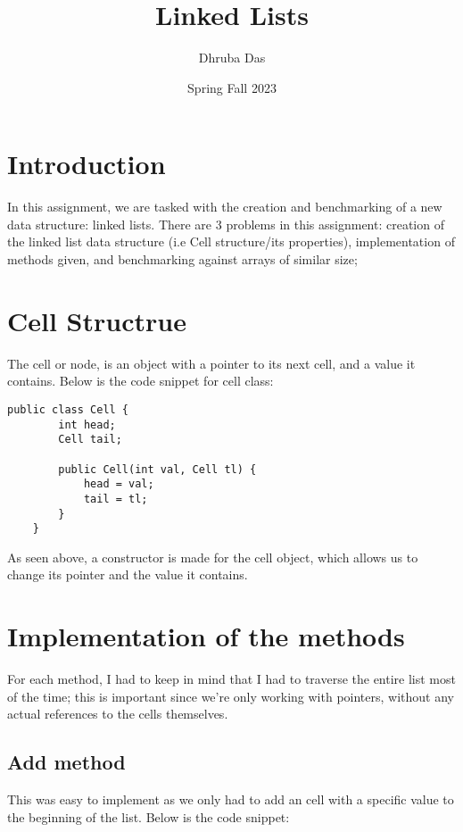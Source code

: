 \documentclass[a4paper,11pt]{article}
\begin{document}
\title{
    \textbf{Linked Lists}
}
\author{Dhruba Das}
\date{Spring Fall 2023}

\maketitle

\section*{Introduction}
In this assignment, we are tasked with the creation and benchmarking of a new data structure:  linked lists. There are 3 problems in this assignment: creation of the linked list data structure (i.e Cell structure/its properties), implementation of methods given, and benchmarking against arrays of similar size;

\section*{Cell Structrue}

The cell or node, is an object with a pointer to its next cell, and a value it contains. Below is the code snippet for cell class:

\begin{verbatim}
public class Cell {
        int head;
        Cell tail;
    
        public Cell(int val, Cell tl) {
            head = val;
            tail = tl;
        }
    }
\end{verbatim}
As seen above, a constructor is made for the cell object, which allows us to change its pointer and the value it contains.

\section*{Implementation of the methods}

For each method, I had to keep in mind that I had to traverse the entire list most of the time; this is important since we're only working with pointers, without any actual references to the cells themselves.


\subsection*{Add method}

This was easy to implement as we only had to add an cell with a specific value to the beginning of the list. Below is the code snippet:
 
\end{document}
